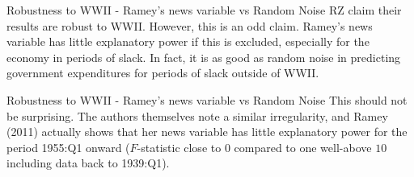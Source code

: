 \documentclass{beamer}
\begin{document}
%
%
%

\begin{frame}{Robustness to WWII - Ramey's news variable vs Random Noise}
  RZ claim their results are robust to WWII. However, this is an odd claim. Ramey's news variable has little explanatory power if this is excluded, especially for the economy in periods of slack. In fact, it is as good as random noise in predicting government expenditures for periods of slack outside of WWII.
  \begin{figure}[ht!]
    \centering
    \label{fig:wwiirobustness_explanatory}
  \end{figure}
\end{frame}

\begin{frame}{Robustness to WWII - Ramey's news variable vs Random Noise}
  This should not be surprising. The authors themselves note a similar irregularity, and Ramey (2011) actually shows that her news variable has little explanatory power for the period 1955:Q1 onward ($F$-statistic close to $0$ compared to one well-above $10$ including data back to 1939:Q1).
  \begin{figure}[ht!]
    \centering
    \label{fig:wwiirobustness_fstat}
  \end{figure}
\end{frame}
\end{document}
